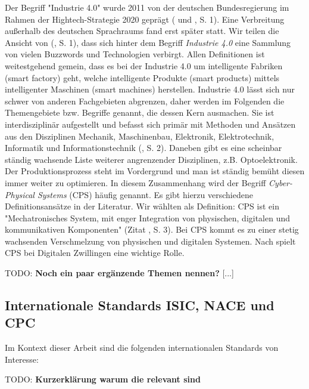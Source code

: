 \documentclass{article}
\begin{document}
Der Begriff "Industrie 4.0" wurde 2011 von der deutschen Bundesregierung im Rahmen der Hightech-Strategie 2020 geprägt (\cite{lasi2014industrie} und \cite{trotta2018industry}, S. 1).
Eine Verbreitung außerhalb des deutschen Sprachraums fand erst später statt.
Wir teilen die Ansicht von (\cite{ragavan2016engineering}, S. 1), dass sich hinter dem Begriff \textit{Industrie 4.0} eine Sammlung von vielen Buzzwords und Technologien verbirgt.
Allen Definitionen ist weitestgehend gemein, dass es bei der Industrie 4.0 um intelligente Fabriken (smart factory) geht, welche intelligente Produkte (smart products) mittels intelligenter Maschinen (smart machines) herstellen.
Industrie 4.0 lässt sich nur schwer von anderen Fachgebieten abgrenzen, daher werden im Folgenden die Themengebiete bzw. Begriffe genannt, die dessen Kern ausmachen.
Sie ist interdisziplinär aufgestellt und befasst sich primär mit Methoden und Ansätzen aus den  Disziplinen Mechanik, Maschinenbau, Elektronik, Elektrotechnik, Informatik und Informationstechnik (\cite{ragavan2016engineering}, S. 2).
Daneben gibt es eine scheinbar ständig wachsende Liste weiterer angrenzender Disziplinen, z.B. Optoelektronik.
Der Produktionsprozess steht im Vordergrund und man ist ständig bemüht diesen immer weiter zu optimieren.
In diesem Zusammenhang wird der Begriff \textit{Cyber-Physical Systems} (CPS) häufig genannt. Es gibt hierzu verschiedene Definitionsansätze in der Literatur.
Wir wählten als Definition: CPS ist ein "Mechatronisches System, mit enger Integration von physischen, digitalen und kommunikativen Komponenten" (Zitat \cite{ragavan2016engineering}, S. 3).
Bei CPS kommt es zu einer stetig wachsenden Verschmelzung von physischen und digitalen Systemen. Nach \cite{klein2019architektur} spielt CPS bei Digitalen Zwillingen eine wichtige Rolle.

TODO: \textbf{Noch ein paar ergänzende Themen nennen?} [...]

\subsection{Internationale Standards ISIC, NACE und CPC}

Im Kontext dieser Arbeit sind die folgenden internationalen Standards von Interesse:

TODO: \textbf{Kurzerklärung warum die relevant sind}
\end{document}
